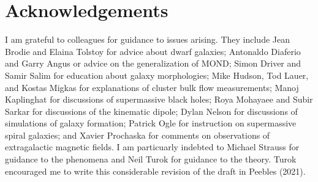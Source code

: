 \documentclass[fleqn,usenatbib]{mnras}
\begin{document}
\section{Acknowledgements}

I am grateful to colleagues for guidance to issues arising. They include Jean Brodie and Elaina Tolstoy for advice about dwarf galaxies; Antonaldo Diaferio and Garry Angus or advice on the generalization of MOND; Simon Driver and Samir Salim for education about galaxy morphologies; Mike Hudson, Tod Lauer, and Kostas Migkas for explanations of cluster bulk flow measurements; Manoj Kaplinghat for discussions of supermassive black holes; Roya Mohayaee and Subir Sarkar for discussions of the kinematic dipole; Dylan Nelson for discussions of simulations of galaxy formation; Patrick Ogle for instruction on supermassive spiral galaxies; and Xavier Prochaska for comments on observations of extragalactic magnetic fields. I am particuarly indebted to Michael Strauss for guidance to the phenomena and Neil Turok for guidance to the theory. Turok encouraged me to write this considerable revision of the draft in Peebles (2021).
\end{document}

